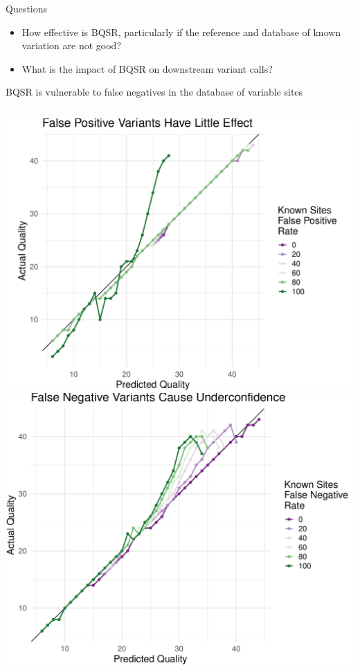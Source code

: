 \documentclass{beamer}
\begin{document}
\begin{frame}{Questions}
\begin{itemize}
	\item How effective is BQSR, particularly if the reference and database of known variation are not good?
	\item What is the impact of BQSR on downstream variant calls? 
\end{itemize}
\end{frame}

\begin{frame}{BQSR is vulnerable to false negatives in the database of variable sites}
\begin{columns}
\includegraphics[width=.95\linewidth]{fpr.pdf}
\includegraphics[width=.95\linewidth]{fnr.pdf}
\end{columns}
\end{frame}
\end{document}
